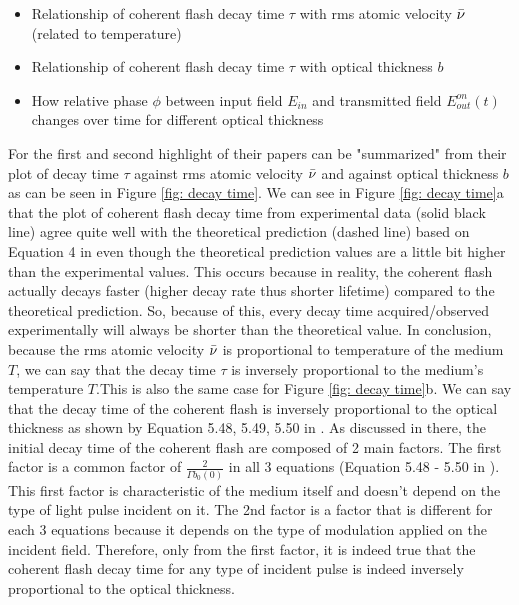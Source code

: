 \begin{itemize}
    \item Relationship of coherent flash decay time $\tau$ with rms atomic velocity $\Bar{\nu}$ (related to temperature)
    \item Relationship of coherent flash decay time $\tau$ with optical thickness $b$
    \item How relative phase $\phi$ between input field $E_{in}$ and transmitted field $E_{out}^{on}(t)$ changes over time for different optical thickness
\end{itemize}

For the first and second highlight of their papers can be "summarized" from their plot of decay time $\tau$ against rms atomic velocity $\Bar{\nu}$ and against optical thickness $b$ as can be seen in Figure \ref{fig: decay time}. We can see in Figure \ref{fig: decay time}a that the plot of coherent flash decay time from experimental data (solid black line) agree quite well with the theoretical prediction (dashed line) based on Equation 4 in \cite{Chalony2011} even though the theoretical prediction values are a little bit higher than the experimental values. This occurs because in reality, the coherent flash actually decays faster (higher decay rate thus shorter lifetime) compared to the theoretical prediction. So, because of this, every decay time acquired/observed experimentally will always be shorter than the theoretical value. In conclusion, because the rms atomic velocity $\Bar{\nu}$ is proportional to temperature of the medium $T$, we can say that the decay time $\tau$ is inversely proportional to the medium's temperature $T$.This is also the same case for Figure \ref{fig: decay time}b. We can say that the decay time of the coherent flash is inversely proportional to the optical thickness as shown by Equation 5.48, 5.49, 5.50 in \cite{Kwong2017}. As discussed in there, the initial decay time of the coherent flash are composed of 2 main factors. The first factor is a common factor of $\frac{2}{\Gamma b_{0}(0)}$ in all 3 equations (Equation 5.48 - 5.50 in \cite{Kwong2017}). This first factor is characteristic of the medium itself and doesn't depend on the type of light pulse incident on it. The 2nd factor is a factor that is different for each 3 equations because it depends on the type of modulation applied on the incident field. Therefore, only from the first factor, it is indeed true that the coherent flash decay time for any type of incident pulse is indeed inversely proportional to the optical thickness.\\

